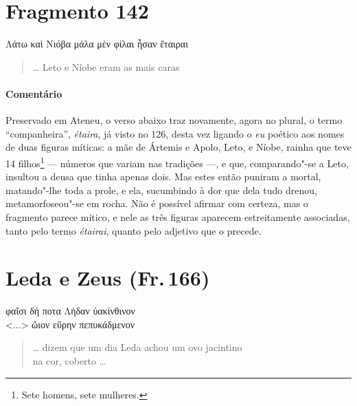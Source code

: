 \section{Fragmento 142}

\begin{gkverse}
Λάτω καὶ Νιόβα μάλα μὲν φίλαι ἦσαν ἔταιραι
\end{gkverse}

\begin{verse}
\ldots{} Leto e Níobe eram as mais caras 
\end{verse}

\medskip

{\paragraph{Comentário} Preservado em Ateneu, o verso abaixo traz novamente,
agora no plural, o termo ``companheira'', \emph{étaira}, já visto no
126, desta vez ligando o \emph{eu} poético aos nomes de duas figuras míticas: a mãe de
Ártemis e Apolo, Leto, e Níobe, rainha que teve 14 filhos\footnote{Sete homens, sete
mulheres.} --- números que variam nas tradições ---, e que, comparando"-se a Leto, insultou a deusa que tinha apenas dois.
Mas estes então puniram a mortal, matando"-lhe toda a prole, e ela, sucumbindo à dor que dela tudo drenou, metamorfoseou"-se em rocha. Não é possível afirmar
com certeza, mas o fragmento parece mítico, e nele as três figuras aparecem
estreitamente associadas, tanto pelo termo \emph{étairai}, quanto pelo
adjetivo que o precede.}




\section{Leda e Zeus (Fr.\,166)}

\begin{gkverse}
φαῖσι δή ποτα Λήδαν ὐακίνθινον\\
<...> ὤιον εὔρην πεπυκάδμενον
\end{gkverse}

\begin{verse}
\ldots{} dizem que um dia Leda achou um ovo jacintino\\
na cor, coberto \ldots{}
\end{verse}

\medskip

